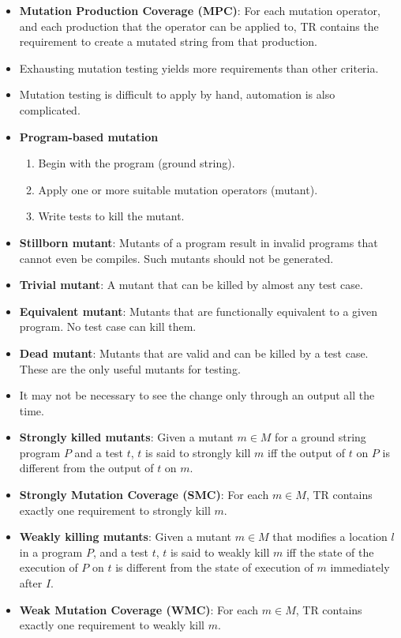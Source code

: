 \documentclass[a4paper]{article}
\begin{document}
\begin{itemize}
    \item \textbf{Mutation Production Coverage (MPC)}: For each mutation operator, and each production that the operator can be applied to, TR contains the requirement to create a mutated string from that production.
    \item Exhausting mutation testing yields more requirements than other criteria.
    \item Mutation testing is difficult to apply by hand, automation is also complicated.
    \item \textbf{Program-based mutation}
    \begin{enumerate}
        \item Begin with the program (ground string).
        \item Apply one or more suitable mutation operators (mutant).
        \item Write tests to kill the mutant.
    \end{enumerate}
    \item \textbf{Stillborn mutant}: Mutants of a program result in invalid programs that cannot even be compiles. Such mutants should not be generated.
    \item \textbf{Trivial mutant}: A mutant that can be killed by almost any test case.
    \item \textbf{Equivalent mutant}: Mutants that are functionally equivalent to a given program. No test case can kill them.
    \item \textbf{Dead mutant}: Mutants that are valid and can be killed by a test case. These are the only useful mutants for testing.
    \item It may not be necessary to see the change only through an output all the time.
    \item \textbf{Strongly killed mutants}: Given a mutant $m\in M$ for a ground string program $P$ and a test $t$, $t$ is said to strongly kill $m$ iff the output of $t$ on $P$ is different from the output of $t$ on $m$.
    \item \textbf{Strongly Mutation Coverage (SMC)}: For each $m\in M$, TR contains exactly one requirement to strongly kill $m$.
    \item \textbf{Weakly killing mutants}: Given a mutant $m\in M$ that modifies a location $l$ in a program $P$, and a test $t$, $t$ is said to weakly kill $m$ iff the state of the execution of $P$ on $t$ is different from the state of execution of $m$ immediately after $I$.
    \item \textbf{Weak Mutation Coverage (WMC)}: For each $m\in M$, TR contains exactly one requirement to weakly kill $m$.

\end{itemize}
\end{document}
